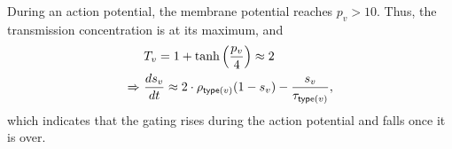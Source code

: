 During an action potential, the membrane potential reaches $p_v > 10$. Thus, the transmission concentration is at its maximum, and
\begin{gather}
\begin{split}
    & T_v = 1 + \tanh \left( \frac{p_{v}}{4} \right) \approx 2 \\
    \Rightarrow \ & \frac{ds_v}{dt} \approx 2 \cdot \rho_{\mathsf{type}(v)} (1 - s_v) - \frac{s_v}{\tau_{\mathsf{type}(v)}},
\end{split}
\end{gather}
which indicates that the gating rises during the action potential and falls once it is over. 